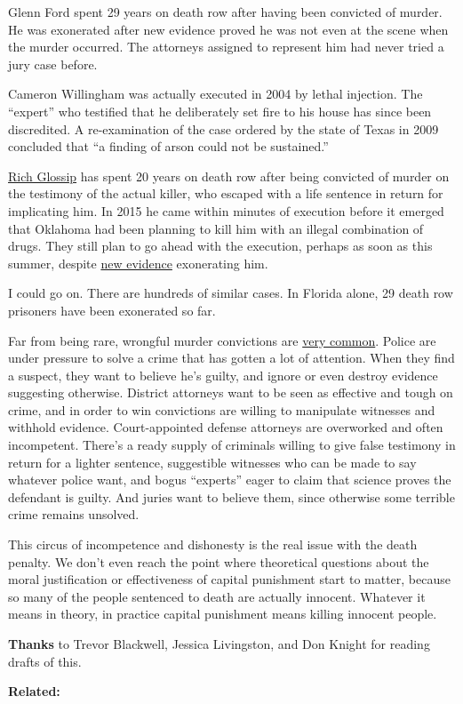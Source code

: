 Glenn Ford spent 29 years on death row after having been convicted of
murder. He was exonerated after new evidence proved he was not even at
the scene when the murder occurred. The attorneys assigned to represent
him had never tried a jury case before.

Cameron Willingham was actually executed in 2004 by lethal injection.
The ``expert'' who testified that he deliberately set fire to his house
has since been discredited. A re-examination of the case ordered by the
state of Texas in 2009 concluded that ``a finding of arson could not be
sustained.''

\href{https://saverichardglossip.com/facts}{Rich Glossip} has spent 20
years on death row after being convicted of murder on the testimony of
the actual killer, who escaped with a life sentence in return for
implicating him. In 2015 he came within minutes of execution before it
emerged that Oklahoma had been planning to kill him with an illegal
combination of drugs. They still plan to go ahead with the execution,
perhaps as soon as this summer, despite
\href{https://www.usnews.com/news/best-states/oklahoma/articles/2020-10-14/attorney-for-oklahoma-death-row-inmate-claims-new-evidence}{new
evidence} exonerating him.

I could go on. There are hundreds of similar cases. In Florida alone, 29
death row prisoners have been exonerated so far.

Far from being rare, wrongful murder convictions are
\href{https://deathpenaltyinfo.org/policy-issues/innocence/description-of-innocence-cases}{very
common}. Police are under pressure to solve a crime that has gotten a
lot of attention. When they find a suspect, they want to believe he's
guilty, and ignore or even destroy evidence suggesting otherwise.
District attorneys want to be seen as effective and tough on crime, and
in order to win convictions are willing to manipulate witnesses and
withhold evidence. Court-appointed defense attorneys are overworked and
often incompetent. There's a ready supply of criminals willing to give
false testimony in return for a lighter sentence, suggestible witnesses
who can be made to say whatever police want, and bogus ``experts'' eager
to claim that science proves the defendant is guilty. And juries want to
believe them, since otherwise some terrible crime remains unsolved.

This circus of incompetence and dishonesty is the real issue with the
death penalty. We don't even reach the point where theoretical questions
about the moral justification or effectiveness of capital punishment
start to matter, because so many of the people sentenced to death are
actually innocent. Whatever it means in theory, in practice capital
punishment means killing innocent people.

\textbf{Thanks} to Trevor Blackwell, Jessica Livingston, and Don Knight
for reading drafts of this.

\textbf{Related:}